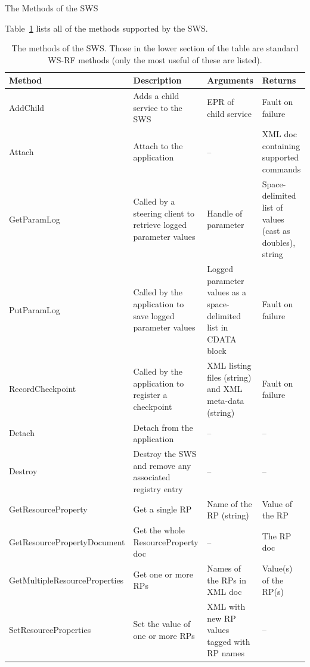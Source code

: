 \documentclass[a4paper]{article}
\begin{document}
\begin{section}{The Methods of the SWS}
\label{sec:swsMethods}

Table~\ref{table:SWSmethods} lists all of the methods supported by the
SWS.

\begin{table}
\begin{center}
\begin{tabular}{l|p{4cm}|p{4cm}|p{3cm}}
\hline\hline
Method & Description & Arguments & Returns\\
\hline
AddChild & Adds a child service to the SWS 
& EPR of child service  
& Fault on failure \\

Attach & Attach to the application & -- 
& XML doc containing supported commands\\

GetParamLog & Called by a steering client to retrieve logged parameter values 
& Handle of parameter 
& Space-delimited list of values (cast as doubles), string \\

PutParamLog & Called by the application to save logged parameter values 
& Logged parameter values as a space-delimited list in CDATA block
& Fault on failure \\

RecordCheckpoint & Called by the application to register a checkpoint 
& XML listing files (string) and XML meta-data (string)
& Fault on failure \\

Detach & Detach from the application & -- & --\\
\hline
Destroy & Destroy the SWS and remove any associated registry entry & -- &--\\
GetResourceProperty & Get a single RP & Name of the RP (string) 
& Value of the RP \\

GetResourcePropertyDocument & Get the whole ResourceProperty doc 
& -- & The RP doc\\

GetMultipleResourceProperties & Get one or more RPs 
& Names of the RPs in XML doc & Value(s) of the RP(s) \\
SetResourceProperties & Set the value of one or more RPs 
& XML with new RP values tagged with RP names & -- \\
\hline\hline
\end{tabular}
\end{center}
\caption{The methods of the SWS.  Those in the lower section of the table 
are standard WS-RF methods (only the most useful of these are listed).}
\label{table:SWSmethods}
\end{table}

\end{section}
\end{document}
